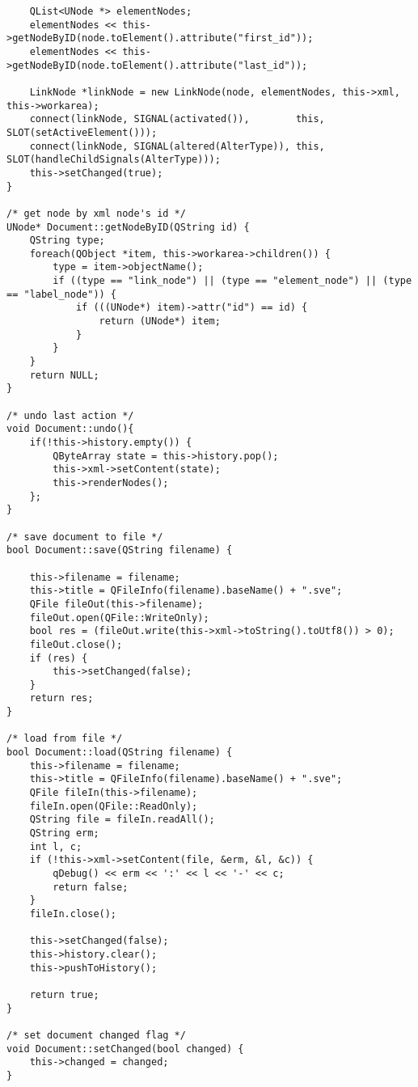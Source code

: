 \begin{lstlisting}
    QList<UNode *> elementNodes;
    elementNodes << this->getNodeByID(node.toElement().attribute("first_id"));
    elementNodes << this->getNodeByID(node.toElement().attribute("last_id"));

    LinkNode *linkNode = new LinkNode(node, elementNodes, this->xml, this->workarea);
    connect(linkNode, SIGNAL(activated()),        this, SLOT(setActiveElement()));
    connect(linkNode, SIGNAL(altered(AlterType)), this, SLOT(handleChildSignals(AlterType)));
    this->setChanged(true);
}

/* get node by xml node's id */
UNode* Document::getNodeByID(QString id) {
    QString type;
    foreach(QObject *item, this->workarea->children()) {
        type = item->objectName();
        if ((type == "link_node") || (type == "element_node") || (type == "label_node")) {
            if (((UNode*) item)->attr("id") == id) {
                return (UNode*) item;
            }
        }
    }
    return NULL;
}

/* undo last action */
void Document::undo(){
    if(!this->history.empty()) {
        QByteArray state = this->history.pop();
        this->xml->setContent(state);
        this->renderNodes();
    };
}

/* save document to file */
bool Document::save(QString filename) {

    this->filename = filename;
    this->title = QFileInfo(filename).baseName() + ".sve";
    QFile fileOut(this->filename);
    fileOut.open(QFile::WriteOnly);
    bool res = (fileOut.write(this->xml->toString().toUtf8()) > 0);
    fileOut.close();
    if (res) {
        this->setChanged(false);
    }
    return res;
}

/* load from file */
bool Document::load(QString filename) {
    this->filename = filename;
    this->title = QFileInfo(filename).baseName() + ".sve";
    QFile fileIn(this->filename);
    fileIn.open(QFile::ReadOnly);
    QString file = fileIn.readAll();
    QString erm;
    int l, c;
    if (!this->xml->setContent(file, &erm, &l, &c)) {
        qDebug() << erm << ':' << l << '-' << c;
        return false;
    }
    fileIn.close();

    this->setChanged(false);
    this->history.clear();
    this->pushToHistory();

    return true;
}

/* set document changed flag */
void Document::setChanged(bool changed) {
    this->changed = changed;
}


\end{lstlisting}
